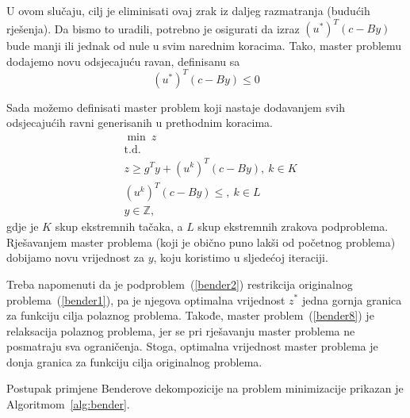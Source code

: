 \documentclass[b5paper, utf8, 11pt, colorlinks]{book}
\theoremstyle{definition}
\begin{document}
U ovom slučaju, cilj je eliminisati ovaj zrak iz daljeg razmatranja (budućih rješenja). Da bismo to uradili, potrebno je osigurati da izraz $(u^*)^T(c-By)$ bude manji ili jednak od nule u svim narednim koracima. Tako, master problemu dodajemo novu odsjecajuću ravan, definisanu sa
\begin{equation}
	\label{bender7}
	(u^*)^T(c-By)\leqslant 0
\end{equation}
 
Sada možemo definisati master problem koji nastaje dodavanjem svih odsjecajućih ravni generisanih u prethodnim koracima.
  \begin{equation}
	\begin{aligned}\label{bender8}
		&\min\ z\\
		&\mbox{t.d.} \\
		&z \geq g^Ty+(u^k)^T(c-By) , \ k \in K\\
		& (u^k)^T(c-By) \leq, \ k \in L\\
		&y \in \mathbb{Z},
	\end{aligned}
\end{equation}
 gdje je $K$ skup ekstremnih tačaka, a $L$ skup ekstremnih zrakova podproblema. Rješavanjem master problema (koji je obično puno lakši od početnog problema) dobijamo novu vrijednost za $y$, koju koristimo u sljedećoj iteraciji.
 
 Treba napomenuti da je podproblem~(\ref{bender2}) restrikcija originalnog problema~(\ref{bender1}), pa je njegova optimalna vrijednost $z^*$ jedna gornja granica za funkciju cilja polaznog problema. Takođe, master problem~(\ref{bender8}) je relaksacija polaznog problema, jer se pri rješavanju master problema ne posmatraju sva ograničenja. Stoga, optimalna vrijednost master problema je donja granica za funkciju cilja originalnog problema.
 
 Postupak primjene Benderove dekompozicije na problem minimizacije prikazan je Algoritmom~\ref{alg:bender}.

 
 
\end{document}
